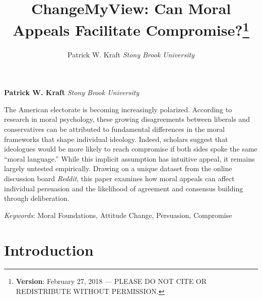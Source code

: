 \documentclass[12pt,]{article}
\title{ChangeMyView: Can Moral Appeals Facilitate Compromise?\thanks{\textbf{Version}: February 27, 2018 --- PLEASE DO NOT CITE OR
REDISTRIBUTE WITHOUT PERMISSION.}  }
\author{\Large Patrick W. Kraft\vspace{0.05in} \newline\normalsize\emph{Stony Brook University}  }
\date{}
\newcommand*{\authorfont}{\fontfamily{phv}\selectfont}
\renewenvironment{abstract}
 {{%
    \setlength{\leftmargin}{0mm}
    \setlength{\rightmargin}{\leftmargin}%
  }%
  \relax}
 {\endlist}
\begin{document}
	
%

{%
\setlength{\parindent}{0pt}
\thispagestyle{plain}
{\fontsize{18}{20}\selectfont\raggedright 
\maketitle  %

}

{
   \vskip 13.5pt\relax \normalsize\fontsize{11}{12} 
\textbf{\authorfont Patrick W. Kraft} \hskip 15pt \emph{\small Stony Brook University}   

}

}








\begin{abstract}

    \hbox{\vrule height .2pt width 39.14pc}

    \vskip 8.5pt %

\noindent The American electorate is becoming increasingly polarized. According to
research in moral psychology, these growing disagreements between
liberals and conservatives can be attributed to fundamental differences
in the moral frameworks that shape individual ideology. Indeed, scholars
suggest that ideologues would be more likely to reach compromise if both
sides spoke the same ``moral language.'' While this implicit assumption
has intuitive appeal, it remains largely untested empirically. Drawing
on a unique dataset from the online discussion board \emph{Reddit}, this
paper examines how moral appeals can affect individual persuasion and
the likelihood of agreement and consensus building through deliberation.


\vskip 8.5pt \noindent \emph{Keywords}: Moral Foundations, Attitude Change, Persuasion, Compromise \par

    \hbox{\vrule height .2pt width 39.14pc}



\end{abstract}


\vskip 6.5pt


\noindent \doublespacing \section{Introduction}\label{introduction}
\end{document}
